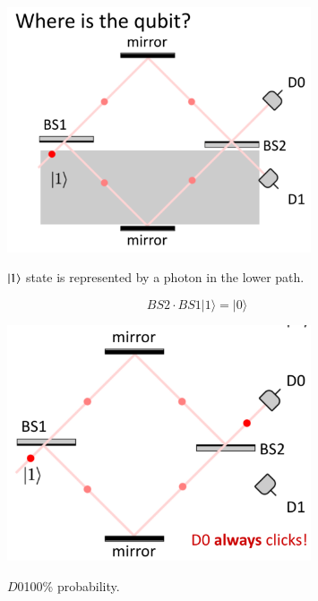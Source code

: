 \begin{figure}[H]
   \centering
    \includegraphics[width=0.8\textwidth]{lesson6/1_ket_bottom.pdf}
    \label{fig: 1}
    \begin{center}
        \caption{$\ket{1}$ state is represented by a photon in the lower path.}
    \end{center}
\end{figure}

\begin{equation}
B S 2 \cdot B S 1|1\rangle=|0\rangle
\end{equation}

\begin{figure}[H]
   \centering
    \includegraphics[width=0.8\textwidth]{lesson6/d0_always_clicks.pdf}
    \label{fig: 1}
    \begin{center}
        \caption{$D0$100\% probability.}
    \end{center}
\end{figure}

